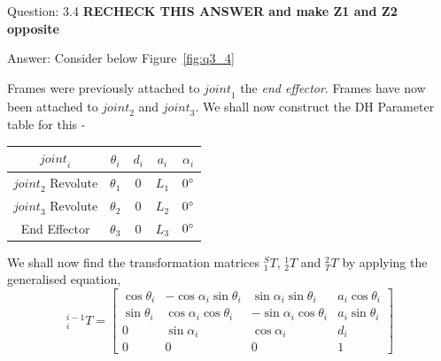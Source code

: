 \documentclass[a4paper]{article}
\begin{document}
\begin{qalist}
		\item[Question: 3.4] \setcounter{equation}{0} \textbf{RECHECK THIS ANSWER and make Z1 and Z2 opposite} %
		\item[Answer:] Consider below Figure~\ref{fig:q3_4} \\
			\begin{minipage}{\linewidth}
				\vspace{0.5cm}
				\centering
				\label{fig:q3_4}
				\vspace{0.5cm}
			\end{minipage}
			Frames were previously attached to ${joint}_{1}$ the \textit{end effector}. Frames have now been attached to ${joint}_{2}$ and ${joint}_{3}$.
			We shall now construct the DH Parameter table for this - \\
			\begin{minipage}{\linewidth}
				\vspace{0.5cm}
				\centering
				\begin{tabular}{|c|c|c|c|c|}
					\hline
					${joint}_{i}$ & ${\theta}_{i}$ & ${d}_{i}$ & ${a}_{i}$ & ${\alpha}_{i}$\\
					\hline \hline
					${joint}_{2}$ Revolute & ${\theta}_{1}$ & $0$ & ${L}_{1}$ & $0 \degree$\\
					\hline
					${joint}_{3}$ Revolute & ${\theta}_{2}$ & $0$ & ${L}_{2}$ & $0\degree$\\
					\hline
					End Effector & ${\theta}_{3}$ & $0$ & ${L}_{3}$ & $0 \degree$\\
					\hline
				\end{tabular}
				\vspace{0.5cm}
			\end{minipage}		
			We shall now find the transformation matrices ${}^{S}_{1}T$, ${}^{1}_{2}T$ and ${}^{2}_{T}T$ by applying the generalised equation,
			\begin{equation}
				{}^{i-1}_{i}T = 
				\begin{bmatrix}
					\cos{\theta}_{i} & -\cos{\alpha}_{i}\sin{\theta}_{i} & \sin{\alpha}_{i}\sin{\theta}_{i} & {a}_{i}\cos{\theta}_{i} \\
					\sin{\theta}_{i} & \cos{\alpha}_{i}\cos{\theta}_{i} & -\sin{\alpha}_{i}\cos{\theta}_{i} & {a}_{i}\sin{\theta}_{i} \\
					0 & \sin{\alpha}_{i} & \cos{\alpha}_{i} & {d}_{i} \\
					0 & 0 & 0 & 1
				\end{bmatrix}
			\end{equation}
			

\end{qalist}
\end{document}
